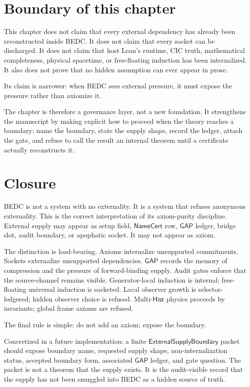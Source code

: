\section{Boundary of this chapter}
\label{sec:external-supply-boundary-of-this-chapter}

This chapter does not claim that every external dependency has already been reconstructed inside BEDC. It does not claim that every socket can be discharged. It does not claim that host Lean's runtime, CIC truth, mathematical completeness, physical spacetime, or free-floating induction has been internalized. It also does not prove that no hidden assumption can ever appear in prose.

Its claim is narrower: when BEDC sees external pressure, it must expose the pressure rather than axiomize it.

The chapter is therefore a governance layer, not a new foundation. It strengthens the manuscript by making explicit how to proceed when the theory reaches a boundary: name the boundary, state the supply shape, record the ledger, attach the gate, and refuse to call the result an internal theorem until a certificate actually reconstructs it.

\section{Closure}
\label{sec:external-supply-closure}

BEDC is not a system with no externality. It is a system that refuses anonymous externality. This is the correct interpretation of its axiom-purity discipline. External supply may appear as setup field, $\mathsf{NameCert}$ row, $\mathsf{GAP}$ ledger, bridge slot, audit boundary, or apophatic socket. It may not appear as axiom.

The distinction is load-bearing. Axioms internalize unsupported commitments. Sockets externalize unsupported dependencies. $\mathsf{GAP}$ records the memory of compression and the pressure of forward-binding supply. Audit gates enforce that the source-channel remains visible. Generator-local induction is internal; free-floating universal induction is socketed. Local observer growth is selector-ledgered; hidden observer choice is refused. Multi-$\mathsf{Hist}$ physics proceeds by invariants; global frame axioms are refused.

The final rule is simple: do not add an axiom; expose the boundary.

Concretized in a future implementation: a finite $\mathsf{ExternalSupplyBoundary}$ packet should expose boundary name, requested supply shape, non-internalization status, accepted boundary form, associated $\mathsf{GAP}$ ledger, and gate question. The packet is not a theorem that the supply exists. It is the audit-visible record that the supply has not been smuggled into BEDC as a hidden source of truth.

